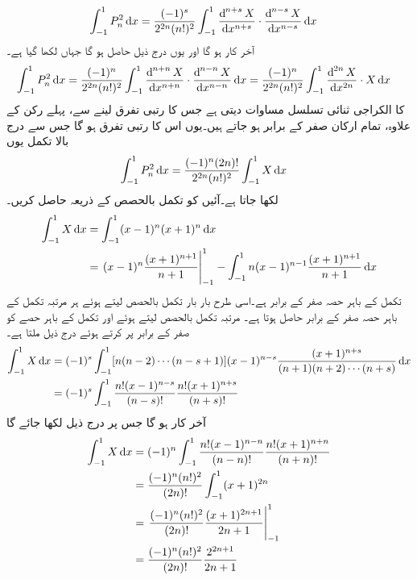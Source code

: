  \begin{align*}
\int_{-1}^{1} P_n^2  \dif x&=\frac{(-1)^s}{2^{2n}(n!)^2}\int_{-1}^{1}\frac{\dif^{\,n+s} X}{\dif x^{n+s}} \cdot \frac{\dif^{\,n-s}X}{\dif x^{n-s}}\dif x
\end{align*}
آخر کار  ہو گا اور یوں درج ذیل حاصل ہو گا جہاں  لکھا گیا ہے۔
 \begin{align*}
\int_{-1}^{1} P_n^2  \dif x&=\frac{(-1)^n}{2^{2n}(n!)^2}\int_{-1}^{1}\frac{\dif^{\,n+n} X}{\dif x^{n+n}} \cdot \frac{\dif^{\,n-n}X}{\dif x^{n-n}} \dif x=\frac{(-1)^n}{2^{2n}(n!)^2}\int_{-1}^{1}\frac{\dif^{\,2n} X}{\dif x^{2n}} \cdot X \dif x
\end{align*}
  کا الکراجی ثنائی تسلسل مساوات  دیتی ہے جس کا رتبی تفرق لینے سے، پہلے رکن کے علاوہ، تمام ارکان صفر کے برابر ہو جاتے ہیں۔یوں اس کا  رتبی تفرق   ہو گا جس سے درج بالا تکمل یوں
 \begin{align}\label{مساوات_بیسل_سوال_عمومی_ت}
\int_{-1}^{1} P_n^2  \dif x&=\frac{(-1)^n (2n)!}{2^{2n}(n!)^2}\int_{-1}^{1} X \dif x
\end{align}
لکھا جاتا ہے۔آئیں  کو تکمل بالحصص کے ذریعہ حاصل کریں۔
\begin{align*}
\int_{-1}^{1}X\dif x&=\int_{-1}^{1} (x-1)^n(x+1)^n\dif x\\
&=\left.(x-1)^n\frac{(x+1)^{n+1}}{n+1} \right|_{-1}^{1}-\int_{-1}^{1} n(x-1)^{n-1}\frac{(x+1)^{n+1}}{n+1}\dif x
\end{align*}
تکمل کے باہر حصہ صفر کے برابر ہے۔اسی طرح بار بار تکمل بالحصص لیتے ہوئے ہر مرتبہ تکمل کے باہر حصہ صفر کے برابر حاصل ہوتا ہے۔ مرتبہ تکمل بالحصص لیتے ہوئے اور تکمل کے باہر حصے کو صفر کے برابر پر کرتے ہوئے  درج ذیل ملتا ہے۔
\begin{align*}
\int_{-1}^{1}X\dif x&=(-1)^s\int_{-1}^{1} [n(n-2)\cdots (n-s+1)](x-1)^{n-s}\frac{(x+1)^{n+s}}{(n+1)(n+2)\cdots (n+s)}\dif x\\
&=(-1)^s\int_{-1}^{1} \frac{n! (x-1)^{n-s}}{(n-s)!} \frac{n!(x+1)^{n+s}}{(n+s)!}
\end{align*}
آخر کار  ہو گا جس پر درج ذیل لکھا جائے گا
\begin{align*}
\int_{-1}^{1}X\dif x&=(-1)^n\int_{-1}^{1} \frac{n! (x-1)^{n-n}}{(n-n)!} \frac{n!(x+1)^{n+n}}{(n+n)!}\\
&=\frac{(-1)^n(n!)^2}{(2n)!}\int_{-1}^{1} (x+1)^{2n}\\
&=\left. \frac{(-1)^n(n!)^2}{(2n)!}\frac{(x+1)^{2n+1}}{2n+1}\right|_{-1}^{1}\\
&=\frac{(-1)^n(n!)^2}{(2n)!}\frac{2^{2n+1}}{2n+1}
\end{align*}
